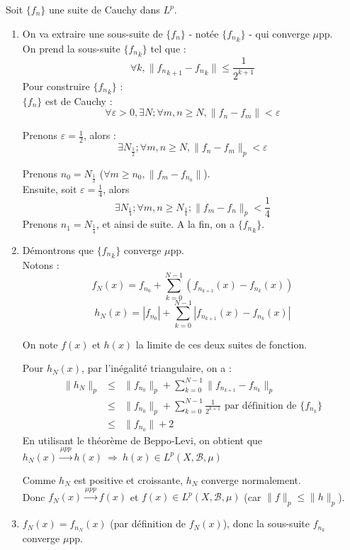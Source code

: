 \begin{dem}
Soit $\{f_n\}$ une suite de Cauchy dans $L^p$.
\begin{enumerate}
\item On va extraire une sous-suite de $\{f_n\}$ - notée $\{{f_n}_k\}$ - qui converge $\mu$pp.\\
On prend la sous-suite $\{{f_n}_k\}$ tel que :
\[\forall k, \|{f_n}_{k+1}-{f_n}_k\| \leq \frac{1}{2^{k+1}}\]
Pour construire $\{{f_n}_k\}$ : \\
$\{f_n\}$ est de Cauchy :
\[\forall \varepsilon>0, \exists N; \forall m,n\geq N, \|f_n-f_m\|<\varepsilon\]

Prenons $\varepsilon=\frac{1}{2}$, alors :
\[\exists N_{\frac{1}{2}}; \forall m,n\geq N, \|f_n-f_m\|_p<\varepsilon\]

\bigskip
Prenons $n_0=N_{\frac{1}{2}}$ ($\forall m\geq n_0, \|f_m-f_{n_0}\|$).\\
Ensuite, soit $\varepsilon=\frac{1}{4}$, alors 
\[\exists N_{\frac{1}{4}}; \forall m,n\geq N_{\frac{1}{4}}; \|f_m-f_n\|_p < \frac{1}{4}\]
Prenons $n_1=N_{\frac{1}{4}}$, et ainsi de suite. A la fin, on a $\{{f_n}_k\}$.

\bigskip
\item Démontrons que $\{{f_n}_k\}$ converge $\mu$pp.\\
Notons :
\[f_N(x)=f_{n_0}+\sum_{k=0}^{N-1} (f_{n_{k+1}}(x)-f_{n_k}(x))\]
\[h_N(x)=|f_{n_0}|+\sum_{k=0}^{N-1} |f_{n_{k+1}}(x)-f_{n_k}(x)|\]

On note $f(x)$ et $h(x)$ la limite de ces deux suites de fonction.

\bigskip
Pour $h_N(x)$, par l'inégalité triangulaire, on a :
\begin{eqnarray*}
	\|h_N\|_p&\leq& \|f_{n_0}\|_p + \sum_{k=0}^{N-1} \|f_{n_{k+1}}-f_{n_k}\|_p\\
		&\leq& \|f_{n_0}\|_p + \sum_{k=0}^{N-1} \frac{1}{2^{k+1}} \text{ par définition de } \{f_{n_k}\} \\
	 	&\leq& \|f_{n_0}\| + 2
\end{eqnarray*}
En utilisant le théorème de Beppo-Levi, on obtient que $h_N(x)\xrightarrow{\mu pp}h(x)\ \Rightarrow\ h(x)\in L^p(X,\mathcal{B},\mu)$

\bigskip
Comme $h_N$ est positive et croissante, $h_N$ converge normalement.\\
Donc $f_N(x)\xrightarrow{\mu pp} f(x)$ et $f(x)\in L^p(X,\mathcal{B},\mu)$ (car $\|f\|_p\leq \|h\|_p$).

\bigskip
\item $f_N(x)=f_{n_N}(x)$ (par définition de $f_N(x)$), donc la sous-suite $f_{n_k}$ converge $\mu$pp.


\end{enumerate}
\end{dem}
